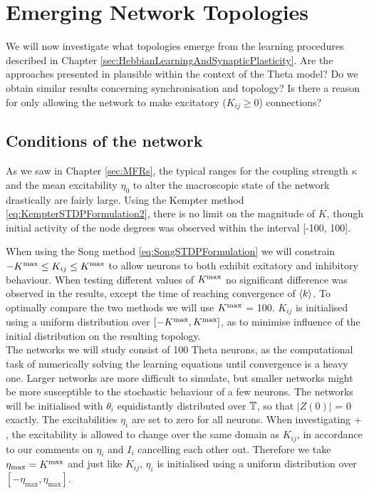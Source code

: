 \newpage
\section{\mywork Emerging Network Topologies} \label{sec:EmergingNetworkTopologies}

We will now investigate what topologies emerge from the learning procedures described in Chapter \ref{sec:HebbianLearningAndSynapticPlasticity}. Are the approaches presented in \cite{Kempter1999, Song2000, Song2017, ChrolCannon2012} plausible within the context of the Theta model? Do we obtain similar results concerning synchronisation and topology? Is there a reason for only allowing the network to make excitatory ($K_{ij} \geq 0$) connections? 

\subsection{Conditions of the network}
As we saw in Chapter \ref{sec:MFRs}, the typical ranges for the coupling strength $\kappa$ and the mean excitability $\eta_0$ to alter the macroscopic state of the network drastically are fairly large. Using the Kempter method \eqref{eq:KempterSTDPFormulation2}, there is no limit on the magnitude of $K$, though initial activity of the node degrees was observed within the interval [-100, 100]. 

When using the Song method \eqref{eq:SongSTDPFormulation} we will constrain $-K^{\rm max} \leq K_{ij} \leq K^{\rm max}$ to allow neurons to both exhibit exitatory and inhibitory behaviour. When testing different values of $K^{\rm max}$ no significant difference was observed in the results, except the time of reaching convergence of ${\langle k\rangle}$. To optimally compare the two methods we will use $K^{\rm max}$ = 100. $K_{ij}$ is initialised using a uniform distribution over $[-K^{\rm max}, K^{\rm max}]$, as to minimise influence of the initial distribution on the resulting topology.\\

The networks we will study consist of 100 Theta neurons, as the computational task of numerically solving the learning equations until convergence is a heavy one. Larger networks are more difficult to simulate, but smaller networks might be more susceptible to the stochastic behaviour of a few neurons. The networks will be initialised with $\theta_i$ equidistantly distributed over ${\mathbb{T}}$, so that $| Z(0) |$ = 0 exactly. The excitabilities $\eta_i$ are set to zero for all neurons. 
When investigating \STDP + \IP, the excitability is allowed to change over the same domain as $K_{ij}$, in accordance to our comments on $\eta_i$ and $I_i$ cancelling each other out. Therefore we take $\eta_{\max} = K^{\rm max}$ and just like $K_{ij}$, $\eta_i$ is initialised using a uniform distribution over $[-\eta_{\max}, \eta_{\max}]$.


